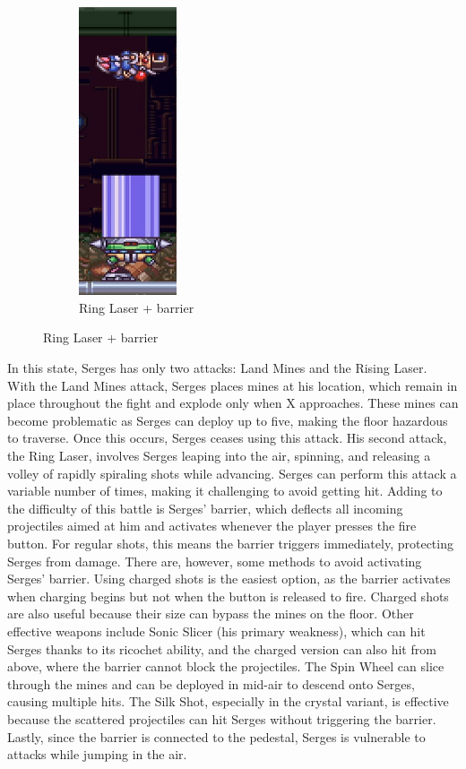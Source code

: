 \begin{figure}[htp]
\begin{minipage}{.35\linewidth}
		\centering
		\begin{subfigure}[t]{\linewidth}
			\centering
			\includegraphics[height=8.5cm]{figures/X2/Hunter_stages/Serges_barrier_jump.png}
			\caption{Ring Laser + barrier}
		\end{subfigure}
	\end{minipage}
\end{figure}
In this state, Serges has only two attacks: Land Mines and the Rising Laser. With the Land Mines attack, Serges places mines at his location, which remain in place throughout the fight and explode only when X approaches. These mines can become problematic as Serges can deploy up to five, making the floor hazardous to traverse. Once this occurs, Serges ceases using this attack. His second attack, the Ring Laser, involves Serges leaping into the air, spinning, and releasing a volley of rapidly spiraling shots while advancing. Serges can perform this attack a variable number of times, making it challenging to avoid getting hit. Adding to the difficulty of this battle is Serges' barrier, which deflects all incoming projectiles aimed at him and activates whenever the player presses the fire button. For regular shots, this means the barrier triggers immediately, protecting Serges from damage. There are, however, some methods to avoid activating Serges' barrier. Using charged shots is the easiest option, as the barrier activates when charging begins but not when the button is released to fire. Charged shots are also useful because their size can bypass the mines on the floor. Other effective weapons include Sonic Slicer (his primary weakness), which can hit Serges thanks to its ricochet ability, and the charged version can also hit from above, where the barrier cannot block the projectiles. The Spin Wheel can slice through the mines and can be deployed in mid-air to descend onto Serges, causing multiple hits. The Silk Shot, especially in the crystal variant, is effective because the scattered projectiles can hit Serges without triggering the barrier. Lastly, since the barrier is connected to the pedestal, Serges is vulnerable to attacks while jumping in the air.

